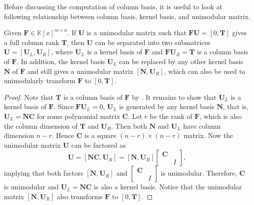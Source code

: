 Before discussing the computation of column basis, it is useful to
look at following relationship between column basis, kernel basis,
and unimodular matrix.
\begin{lem}
\label{lem:unimodular_kernel_columnBasis}Given $\mathbf{F}\in\mathbb{K}\left[x\right]^{m\times n}$.
If $\mathbf{U}$ is a unimodular matrix such that $\mathbf{F}\mathbf{U}=\left[0,\mathbf{T}\right]$
gives a full column rank $\mathbf{T}$, then $\mathbf{U}$ can be
separated into two submatrices $\mathbf{U}=\left[\mathbf{U}_{L},\mathbf{U}_{R}\right]$,
where $\mathbf{U}_{L}$ is a kernel basis of $\mathbf{F}$ and $\mathbf{F}\mathbf{U}_{R}=\mathbf{T}$
is a column basis of $\mathbf{F}$. In addition, the kernel basis
$\mathbf{U}_{L}$ can be replaced by any other kernel basis $\mathbf{N}$
of $\mathbf{F}$ and still gives a unimodular matrix $\left[\mathbf{N},\mathbf{U}_{R}\right]$,
which can also be used to unimodularly transform $\mathbf{F}$ to
$\left[0,\mathbf{T}\right]$. \end{lem}
\begin{proof}
Note that $\mathbf{T}$ is a column basis of $\mathbf{F}$ by .
It remains to show that $\mathbf{U}_{L}$ is a kernel basis of $\mathbf{F}$.
Since $\mathbf{F}\mathbf{U}_{L}=0$, $\mathbf{U}_{L}$ is generated
by any kernel basis $\mathbf{N}$, that is, $\mathbf{U}_{L}=\mathbf{N}\mathbf{C}$
for some polynomial matrix $\mathbf{C}$. Let $r$ be the rank of
$\mathbf{F}$, which is also the column dimension of $\mathbf{T}$
and $\mathbf{U}_{R}$. Then both $\mathbf{N}$ and $\mathbf{U}_{L}$
have column dimension $n-r$. Hence $\mathbf{C}$ is a square $(n-r)\times(n-r)$
matrix. Now the unimodular matrix $\mathbf{U}$ can be factored as
\[
\mathbf{U}=\left[\mathbf{N}\mathbf{C},\mathbf{U}_{R}\right]=\left[\mathbf{N},\mathbf{U}_{R}\right]\begin{bmatrix}\mathbf{C}\\
 & I
\end{bmatrix},
\]
 implying that both factors $\left[\mathbf{N},\mathbf{U}_{R}\right]$
and $\begin{bmatrix}\mathbf{C}\\
 & I
\end{bmatrix}$ is unimodular. Therefore, $\mathbf{C}$ is unimodular and $\mathbf{U}_{L}=\mathbf{N}\mathbf{C}$
is also a kernel basis. Notice that the unimodular matrix $\left[\mathbf{N},\mathbf{U}_{R}\right]$
also transforms $\mathbf{F}$ to $\left[0,\mathbf{T}\right]$.


\end{proof}
